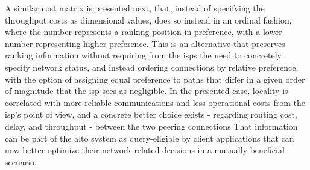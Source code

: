     A similar cost matrix is presented next, that, instead of specifying the throughput costs as dimensional values, does so instead in an ordinal fashion, where the number represents a ranking position in preference, with a lower number representing higher preference.
    This is an alternative that preserves ranking information without requiring from the \gls{isps} the need to concretely specify network status, and instead ordering connections by relative preference, with the option of assigning equal preference to paths that differ in a given order of magnitude that the \gls{isp} sees as negligible.
    In the presented case, locality is correlated with more reliable communications and less operational costs from the \gls{isp}'s point of view, and a concrete better choice exists - regarding routing cost, delay, and throughput - between the two peering connections
    That information can be part of the \gls{alto} system as query-eligible by client applications that can now better optimize their network-related decisions in a mutually beneficial scenario.

